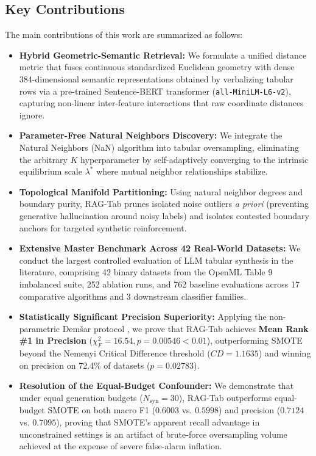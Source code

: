 \documentclass[sn-basic]{sn-jnl}
\begin{document}
\subsection{Key Contributions}
The main contributions of this work are summarized as follows:
\begin{itemize}
    \item \textbf{Hybrid Geometric-Semantic Retrieval:} We formulate a unified distance metric that fuses continuous standardized Euclidean geometry with dense 384-dimensional semantic representations obtained by verbalizing tabular rows via a pre-trained Sentence-BERT transformer (\texttt{all-MiniLM-L6-v2}), capturing non-linear inter-feature interactions that raw coordinate distances ignore.
    \item \textbf{Parameter-Free Natural Neighbors Discovery:} We integrate the Natural Neighbors (NaN) algorithm \citep{huang2011natural} into tabular oversampling, eliminating the arbitrary $K$ hyperparameter by self-adaptively converging to the intrinsic equilibrium scale $\lambda^*$ where mutual neighbor relationships stabilize.
    \item \textbf{Topological Manifold Partitioning:} Using natural neighbor degrees and boundary purity, RAG-Tab prunes isolated noise outliers \emph{a priori} (preventing generative hallucination around noisy labels) and isolates contested boundary anchors for targeted synthetic reinforcement.
    \item \textbf{Extensive Master Benchmark Across 42 Real-World Datasets:} We conduct the largest controlled evaluation of LLM tabular synthesis in the literature, comprising 42 binary datasets from the OpenML Table 9 imbalanced suite, 252 ablation runs, and 762 baseline evaluations across 17 comparative algorithms and 3 downstream classifier families.
    \item \textbf{Statistically Significant Precision Superiority:} Applying the non-parametric Dem\v{s}ar protocol \citep{demsar2006statistical}, we prove that RAG-Tab achieves \textbf{Mean Rank \#1 in Precision} ($\chi_F^2 = 16.54, p = 0.00546 < 0.01$), outperforming SMOTE beyond the Nemenyi Critical Difference threshold ($CD = 1.1635$) and winning on precision on 72.4\% of datasets ($p = 0.02783$).
    \item \textbf{Resolution of the Equal-Budget Confounder:} We demonstrate that under equal generation budgets ($N_{\text{syn}} = 30$), RAG-Tab outperforms equal-budget SMOTE on both macro F1 ($0.6003$ vs. $0.5998$) and precision ($0.7124$ vs. $0.7095$), proving that SMOTE's apparent recall advantage in unconstrained settings is an artifact of brute-force oversampling volume achieved at the expense of severe false-alarm inflation.
\end{itemize}
\end{document}
